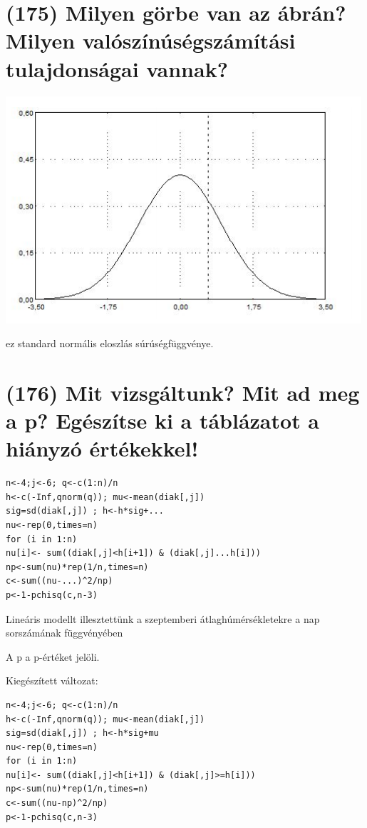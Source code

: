 \documentclass[12p]{article}
\begin{document}
\section{(175) Milyen görbe van az ábrán? Milyen valószínúségszámítási tulajdonságai vannak?}

\includegraphics{gorbe}

ez standard normális eloszlás súrúségfüggvénye.


\section{(176) Mit vizsgáltunk? Mit ad meg a p? Egészítse ki a táblázatot a hiányzó értékekkel!}

\begin{verbatim}
n<-4;j<-6; q<-c(1:n)/n
h<-c(-Inf,qnorm(q)); mu<-mean(diak[,j])
sig=sd(diak[,j]) ; h<-h*sig+...
nu<-rep(0,times=n)
for (i in 1:n)
nu[i]<- sum((diak[,j]<h[i+1]) & (diak[,j]...h[i]))
np<-sum(nu)*rep(1/n,times=n)
c<-sum((nu-...)^2/np)
p<-1-pchisq(c,n-3)
\end{verbatim}

Lineáris modellt illesztettünk a
szeptemberi átlaghúmérsékletekre a nap sorszámának függvényében

A p a p-értéket jelöli.

Kiegészített változat:

\begin{verbatim}
n<-4;j<-6; q<-c(1:n)/n
h<-c(-Inf,qnorm(q)); mu<-mean(diak[,j])
sig=sd(diak[,j]) ; h<-h*sig+mu
nu<-rep(0,times=n)
for (i in 1:n)
nu[i]<- sum((diak[,j]<h[i+1]) & (diak[,j]>=h[i]))
np<-sum(nu)*rep(1/n,times=n)
c<-sum((nu-np)^2/np)
p<-1-pchisq(c,n-3)
\end{verbatim}
\end{document}
